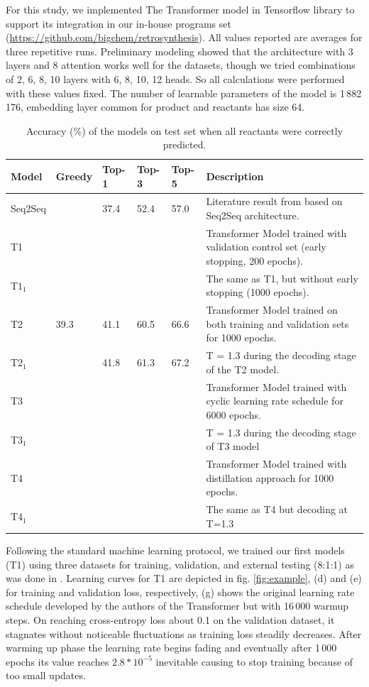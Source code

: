 \documentclass{article}
\begin{document}
For this study, we implemented The Transformer model in Tensorflow library to support its integration in our in-house programs set (\url{https://github.com/bigchem/retrosynthesis}).  All values reported are averages for three repetitive runs. Preliminary modeling showed that the architecture with 3 layers and 8 attention works well for the datasets, though we tried combinations of 2, 6, 8, 10 layers with 6, 8, 10, 12 heads. So all calculations were performed with these values fixed.  The number of learnable parameters of the model is 1\,882\,176, embedding layer common for product and reactants has size 64.
\begin{table}[b!]
  \caption{Accuracy (\%) of the models on test set when all reactants were correctly predicted.}
  \centering
  \begin{tabular}{p{2cm}p{1cm}p{1cm}p{1cm}p{1cm}p{8cm}}
    \toprule
    Model & Greedy & Top-1 & Top-3 & Top-5 & Description\\
    \midrule
    Seq2Seq &  & 37.4  & 52.4 & 57.0 & Literature result from \cite{Pande} based on Seq2Seq architecture. \\
    T1         & &  &  &  & Transformer Model trained with validation control set (early stopping, 200 epochs). \\
    T$1_1$ & &  &  &  & The same as T1, but without early stopping (1000 epochs). \\ 
    T2         & 39.3 & 41.1 & 60.5 & 66.6 & Transformer Model trained on both training and validation sets for 1000 epochs.\\
    T$2_1$ & & 41.8 & 61.3 & 67.2 & T = 1.3 during the decoding stage of the T2 model. \\
    T3         & &  & & & Transformer Model trained with cyclic learning rate schedule for 6000 epochs.\\
    T$3_1$ & &   & & & T =  1.3 during the decoding stage of T3 model \\
    T4         & &  &  &  & Transformer Model trained with distillation approach \cite{Hinton} for 1000 epochs.\\ 
    T$4_1$ & &  &  &  & The same as T4 but decoding at T=1.3 \\
     \bottomrule
  \end{tabular}
  \label{tbl:results}
\end{table}

Following the standard machine learning protocol, we trained our first models (T1) using three datasets for training, validation, and external testing (8:1:1) as was done in \cite{Pande}. Learning curves for T1 are depicted in fig. \ref{fig:example}, (d) and (e) for training and validation loss, respectively, (g) shows the original learning rate schedule developed by the authors of the Transformer but with 16\,000 warmup steps. On reaching cross-entropy loss about 0.1 on the validation dataset, it stagnates without noticeable fluctuations as training loss steadily decreases. After warming up phase the learning rate begins fading and eventually after 1\,000 epochs its value reaches $2.8*10^{-5}$ inevitable causing to stop training because of too small updates. 
\end{document}
